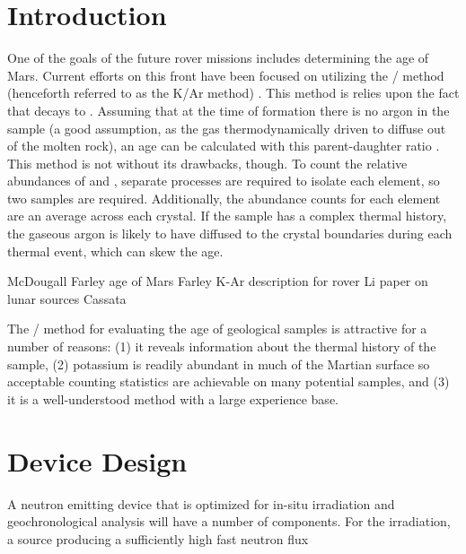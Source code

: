 \documentclass{mc2015}
\begin{document}
\section{Introduction}

One of the goals of the future rover missions includes determining the age of Mars. Current efforts on this front have been focused on utilizing the / method (henceforth referred to as the K/Ar method) \cite{farley_situ_2014,farley_double-spike_2013,cassata_situ_2014}. This method is relies upon the fact that  decays to . Assuming that at the time of formation there is no argon in the sample (a good assumption, as the gas thermodynamically driven to diffuse out of the molten rock), an age can be calculated with this parent-daughter ratio \cite{mcdougall_geochronology_1999}. This method is not without its drawbacks, though. To count the relative abundances of  and , separate processes are required to isolate each element, so two samples are required. Additionally, the abundance counts for each element are an average across each crystal. If the sample has a complex thermal history, the gaseous argon is likely to have diffused to the crystal boundaries during each thermal event, which can skew the age.  

McDougall \cite{mcdougall_geochronology_1999}
Farley age of Mars \cite{farley_situ_2014}
Farley K-Ar description for rover \cite{farley_double-spike_2013}
Li paper on lunar sources \cite{li_evaluation_2011}
Cassata \cite{cassata_situ_2014}

The / method for evaluating the age of geological samples is attractive for a number of reasons: (1) it reveals information about the thermal history of the sample, (2) potassium is readily abundant in much of the Martian surface so acceptable counting statistics are achievable on many potential samples, and (3) it is a well-understood method with a large experience base. 

\section{Device Design}

A neutron emitting device that is optimized for in-situ irradiation and geochronological analysis will have a number of components. For the irradiation, a source producing a sufficiently high fast neutron flux
\end{document}

